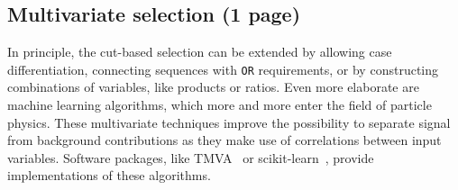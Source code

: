 
\subsection{Multivariate selection (1 page)}
\label{sec:dataanalysis:selection:bdt}

In principle, the cut-based selection can be extended by allowing case
differentiation, \ie connecting sequences with \texttt{OR} requirements, or by
constructing combinations of variables, like products or ratios. Even more
elaborate are machine learning algorithms, which more and more enter the field
of particle physics. These multivariate techniques improve the possibility to
separate signal from background contributions as they make use of correlations
between input variables. Software packages, like TMVA~\cite{Hocker:2007ht} or
scikit-learn~\cite{scikit-learn}, provide implementations of these algorithms.

